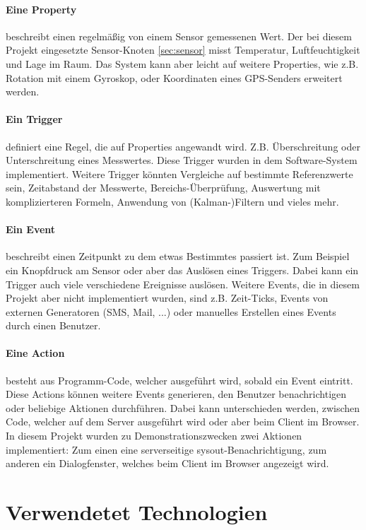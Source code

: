\documentclass[12pt,a4paper,twoside]{article}
\newcommand{\labelSec}[1]{\label{sec:#1}}
\begin{document}
\paragraph{Eine Property} beschreibt einen regelmäßig von einem Sensor gemessenen Wert. Der bei diesem Projekt eingesetzte Sensor-Knoten \ref{sec:sensor} misst Temperatur, Luftfeuchtigkeit und Lage im Raum. Das System kann aber leicht auf weitere Properties, wie z.B. Rotation mit einem Gyroskop, oder Koordinaten eines GPS-Senders erweitert werden. 
\paragraph{Ein Trigger} definiert eine Regel, die auf Properties angewandt wird. Z.B. Überschreitung oder Unterschreitung eines Messwertes. Diese Trigger wurden in dem Software-System implementiert. Weitere Trigger könnten Vergleiche auf bestimmte Referenzwerte sein, Zeitabstand der Messwerte, Bereichs-Überprüfung, Auswertung mit komplizierteren Formeln, Anwendung von (Kalman-)Filtern  und vieles mehr. 
\paragraph{Ein Event} beschreibt einen Zeitpunkt zu dem etwas Bestimmtes passiert ist. Zum Beispiel ein Knopfdruck am Sensor oder aber das Auslösen eines Triggers. Dabei kann ein Trigger auch viele verschiedene Ereignisse auslösen. Weitere Events, die in diesem Projekt aber nicht implementiert wurden, sind z.B. Zeit-Ticks, Events von externen Generatoren (SMS, Mail, ...) oder manuelles Erstellen eines Events durch einen Benutzer.

\paragraph{Eine Action} besteht aus Programm-Code, welcher ausgeführt wird, sobald ein Event eintritt. Diese Actions können weitere Events generieren, den Benutzer benachrichtigen oder beliebige Aktionen durchführen. Dabei kann unterschieden werden, zwischen Code, welcher auf dem Server ausgeführt wird oder aber beim Client im Browser. In diesem Projekt wurden zu Demonstrationszwecken zwei Aktionen implementiert: Zum einen eine serverseitige sysout-Benachrichtigung, zum anderen ein Dialogfenster, welches beim Client im Browser angezeigt wird. 

\section{Verwendetet Technologien} \labelSec{abschnitt}
\end{document}
